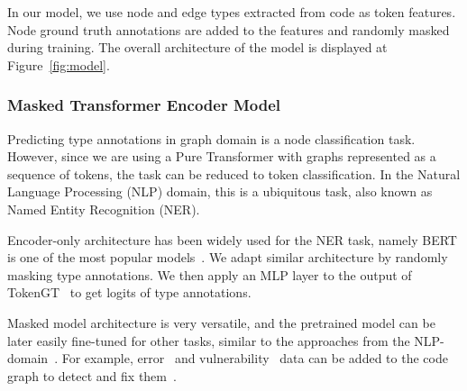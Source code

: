 \begin{figure*}
    \resizebox{\textwidth}{!}{}
    \caption{GraphTyper Architecture}
    \label{fig:model}
\end{figure*}

In our model, we use node and edge types extracted from code as token features.
Node ground truth annotations are added to the features and randomly masked during training.
The overall architecture of the model is displayed at Figure~\ref{fig:model}.

\subsubsection{Masked Transformer Encoder Model}

Predicting type annotations in graph domain is a node classification task.
However, since we are using a Pure Transformer with graphs represented as a sequence of tokens, the task can be reduced to token classification.
In the Natural Language Processing (NLP) domain, this is a ubiquitous task, also known as Named Entity Recognition (NER).

Encoder-only architecture has been widely used for the NER task, namely BERT is one of the most popular models~\cite{liu2021nerbert,Darji_2023}.
We adapt similar architecture by randomly masking type annotations.
We then apply an MLP layer to the output of TokenGT~\cite{kim_pure_2022} to get logits of type annotations.

Masked model architecture is very versatile, and the pretrained model can be later easily fine-tuned for other tasks,
similar to the approaches from the NLP-domain~\cite{liu2021nerbert}.
For example, error~\cite{bieber2022static} and vulnerability~\cite{sun2023exploring} data can be added to the code graph to detect and fix them~\cite{nguyen_regvd_2021,li_vuldeepecker_2018,cao_bgnn4vd_2021,li_sysevr_2021,russell_automated_2018}.
